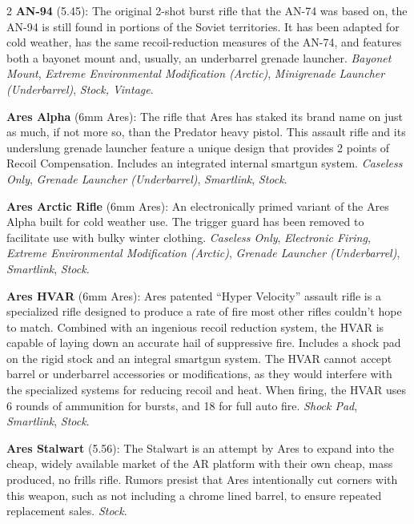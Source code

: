\documentclass[
  oneside]{article}
\begin{document}
\begin{multicols}{2}
\textbf{AN-94} (5.45): The original 2-shot burst
rifle that the AN-74 was based on, the AN-94 is
still found in portions of the Soviet territories.
It has been adapted for cold weather, has the same
recoil-reduction measures of the AN-74, and
features both a bayonet mount and, usually, an
underbarrel grenade launcher. \emph{Bayonet
Mount}, \emph{Extreme Environmental Modification
(Arctic)}, \emph{Minigrenade Launcher
(Underbarrel)}, \emph{Stock, Vintage}.

\textbf{Ares Alpha} (6mm Ares): The rifle that
Ares has staked its brand name on just as much, if
not more so, than the Predator heavy pistol. This
assault rifle and its underslung grenade launcher
feature a unique design that provides 2 points of
Recoil Compensation. Includes an integrated
internal smartgun system. \emph{Caseless Only},
\emph{Grenade Launcher (Underbarrel)},
\emph{Smartlink}, \emph{Stock}.

\textbf{Ares Arctic Rifle} (6mm Ares): An
electronically primed variant of the Ares Alpha
built for cold weather use. The trigger guard has
been removed to facilitate use with bulky winter
clothing. \emph{Caseless Only}, \emph{Electronic
Firing}, \emph{Extreme Environmental Modification
(Arctic)}, \emph{Grenade Launcher (Underbarrel)},
\emph{Smartlink}, \emph{Stock}.

\textbf{Ares HVAR} (6mm Ares): Ares patented
``Hyper Velocity'' assault rifle is a specialized
rifle designed to produce a rate of fire most
other rifles couldn't hope to match. Combined with
an ingenious recoil reduction system, the HVAR is
capable of laying down an accurate hail of
suppressive fire. Includes a shock pad on the
rigid stock and an integral smartgun system. The
HVAR cannot accept barrel or underbarrel
accessories or modifications, as they would
interfere with the specialized systems for
reducing recoil and heat. When firing, the HVAR
uses 6 rounds of ammunition for bursts, and 18 for
full auto fire. \emph{Shock Pad},
\emph{Smartlink}, \emph{Stock}.

\textbf{Ares Stalwart} (5.56): The Stalwart is an
attempt by Ares to expand into the cheap, widely
available market of the AR platform with their own
cheap, mass produced, no frills rifle. Rumors
presist that Ares intentionally cut corners with
this weapon, such as not including a chrome lined
barrel, to ensure repeated replacement sales.
\emph{Stock}.


\end{multicols}
\end{document}
